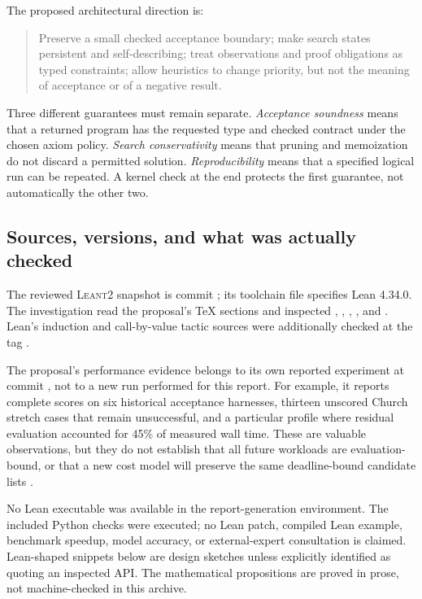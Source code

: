 \documentclass[11pt,a4paper]{article}
\newcommand{\code}[1]{\texttt{\detokenize{#1}}}
\newcommand{\repo}{\textsc{Leant2}}
\theoremstyle{definition}
\theoremstyle{remark}
\begin{document}
The proposed architectural direction is:
\begin{quote}
Preserve a small checked acceptance boundary; make search states persistent and
self-describing; treat observations and proof obligations as typed constraints;
allow heuristics to change priority, but not the meaning of acceptance or of a
negative result.
\end{quote}
Three different guarantees must remain separate. \emph{Acceptance soundness}
means that a returned program has the requested type and checked contract under
the chosen axiom policy. \emph{Search conservativity} means that pruning and
memoization do not discard a permitted solution. \emph{Reproducibility} means
that a specified logical run can be repeated. A kernel check at the end protects
the first guarantee, not automatically the other two.

\subsection{Sources, versions, and what was actually checked}
The reviewed \repo{} snapshot is commit
; its toolchain file specifies
Lean 4.34.0. The investigation read the proposal's TeX sections and inspected
, ,
, , and
. Lean's induction and call-by-value tactic sources
were additionally checked at the \code{v4.34.0} tag
\cite{repo,leaninduction,leancbv}.

The proposal's performance evidence belongs to its own reported experiment at
commit \code{33cec8b}, not to a new run performed for this report. For example,
it reports complete scores on six historical acceptance harnesses, thirteen
unscored Church stretch cases that remain unsuccessful, and a particular profile
where residual evaluation accounted for 45\% of measured wall time. These are
valuable observations, but they do not establish that all future workloads are
evaluation-bound, or that a new cost model will preserve the same deadline-bound
candidate lists \cite{repo}.

No Lean executable was available in the report-generation environment. The
included Python checks were executed; no Lean patch, compiled Lean example,
benchmark speedup, model accuracy, or external-expert consultation is claimed.
Lean-shaped snippets below are design sketches unless explicitly identified as
quoting an inspected API. The mathematical propositions are proved in prose,
not machine-checked in this archive.
\end{document}
